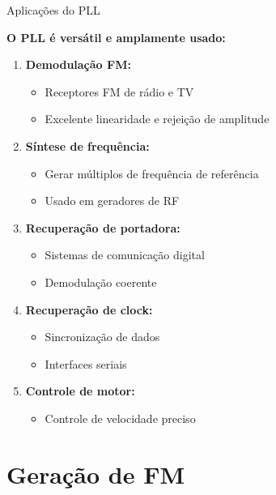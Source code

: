 \begin{frame}{Aplicações do PLL}

\textbf{O PLL é versátil e amplamente usado:}

\begin{enumerate}
\item \textbf{Demodulação FM:}
   \begin{itemize}
   \item Receptores FM de rádio e TV
   \item Excelente linearidade e rejeição de amplitude
   \end{itemize}

\item \textbf{Síntese de frequência:}
   \begin{itemize}
   \item Gerar múltiplos de frequência de referência
   \item Usado em geradores de RF
   \end{itemize}

\item \textbf{Recuperação de portadora:}
   \begin{itemize}
   \item Sistemas de comunicação digital
   \item Demodulação coerente
   \end{itemize}

\item \textbf{Recuperação de clock:}
   \begin{itemize}
   \item Sincronização de dados
   \item Interfaces seriais
   \end{itemize}

\item \textbf{Controle de motor:}
   \begin{itemize}
   \item Controle de velocidade preciso
   \end{itemize}
\end{enumerate}

\end{frame}


\section{Geração de FM}

